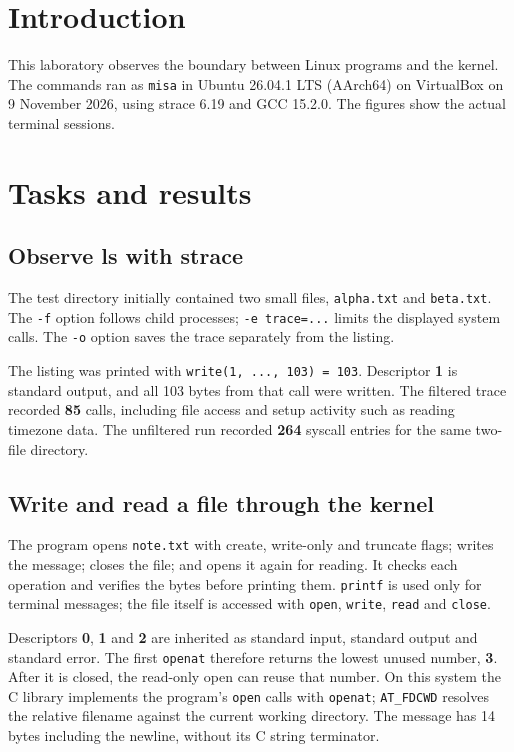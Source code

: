 \chapter{Introduction}
This laboratory observes the boundary between Linux programs and the kernel. The commands ran as \texttt{misa} in Ubuntu 26.04.1 LTS (AArch64) on VirtualBox on 9 November 2026, using strace 6.19 and GCC 15.2.0. The figures show the actual terminal sessions.

\chapter{Tasks and results}
\section{Observe ls with strace}
The test directory initially contained two small files, \texttt{alpha.txt} and \texttt{beta.txt}. The \texttt{-f} option follows child processes; \texttt{-e trace=...} limits the displayed system calls. The \texttt{-o} option saves the trace separately from the listing.


The listing was printed with \texttt{write(1, ..., 103) = 103}. Descriptor \textbf{1} is standard output, and all 103 bytes from that call were written. The filtered trace recorded \textbf{85} calls, including file access and setup activity such as reading timezone data. The unfiltered run recorded \textbf{264} syscall entries for the same two-file directory.

\clearpage
\section{Write and read a file through the kernel}
The program opens \texttt{note.txt} with create, write-only and truncate flags; writes the message; closes the file; and opens it again for reading. It checks each operation and verifies the bytes before printing them. \texttt{printf} is used only for terminal messages; the file itself is accessed with \texttt{open}, \texttt{write}, \texttt{read} and \texttt{close}.


Descriptors \textbf{0}, \textbf{1} and \textbf{2} are inherited as standard input, standard output and standard error. The first \texttt{openat} therefore returns the lowest unused number, \textbf{3}. After it is closed, the read-only open can reuse that number. On this system the C library implements the program's \texttt{open} calls with \texttt{openat}; \texttt{AT\_FDCWD} resolves the relative filename against the current working directory. The message has 14 bytes including the newline, without its C string terminator.

